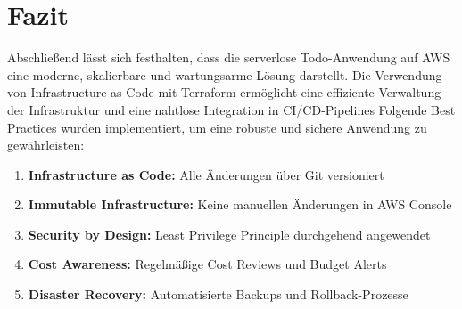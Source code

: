 \section{Fazit}
Abschließend lässt sich festhalten, dass die serverlose Todo-Anwendung auf AWS eine moderne, skalierbare und wartungsarme Lösung darstellt. Die Verwendung von Infrastructure-as-Code mit Terraform ermöglicht eine effiziente Verwaltung der Infrastruktur und eine nahtlose Integration in CI/CD-Pipelines
Folgende Best Practices wurden implementiert, um eine robuste und sichere Anwendung zu gewährleisten:
\begin{enumerate}
    \item \textbf{Infrastructure as Code:} Alle Änderungen über Git versioniert
    \item \textbf{Immutable Infrastructure:} Keine manuellen Änderungen in AWS Console
    \item \textbf{Security by Design:} Least Privilege Principle durchgehend angewendet
    \item \textbf{Cost Awareness:} Regelmäßige Cost Reviews und Budget Alerts
    \item \textbf{Disaster Recovery:} Automatisierte Backups und Rollback-Prozesse
\end{enumerate}
